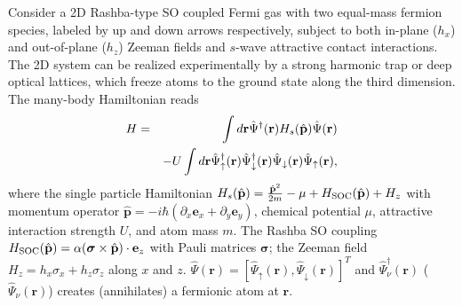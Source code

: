\documentclass[prl,aps,twocolumn,showpacs, floatfix]{revtex4}
\begin{document}
Consider a 2D Rashba-type SO coupled Fermi gas with two equal-mass fermion
species, labeled by up and down arrows respectively, subject to both
in-plane ($h_{x}$) and out-of-plane ($h_{z}$) Zeeman fields and $s$-wave
attractive contact interactions. The 2D system can be realized
experimentally by a strong harmonic trap or deep optical lattices, which
freeze atoms to the ground state along the third dimension. The many-body
Hamiltonian reads%
\begin{eqnarray}
H &=&\int d\mathbf{r}\hat{\Psi}^{\dagger }(\mathbf{r})H_{s}(\hat{\mathbf{p}})%
\hat{\Psi}(\mathbf{r}) \\
&&-U\int d\mathbf{r}\hat{\Psi}_{\uparrow }^{\dagger }(\mathbf{r})\hat{\Psi}%
_{\downarrow }^{\dagger }(\mathbf{r})\hat{\Psi}_{\downarrow }(\mathbf{r})%
\hat{\Psi}_{\uparrow }(\mathbf{r}),  \notag
\end{eqnarray}%
where the single particle Hamiltonian $H_{s}(\hat{\mathbf{p}})=\frac{\hat{%
\mathbf{p}}^{2}}{2m}-\mu +H_{\mathrm{SOC}}(\hat{\mathbf{p}})+H_{z}$ with
momentum operator $\hat{\mathbf{p}}=-i\hbar (\partial _{x}\mathbf{e}%
_{x}+\partial _{y}\mathbf{e}_{y})$, chemical potential $\mu $, attractive
interaction strength $U$, and atom mass $m$. The Rashba SO coupling $H_{%
\mathrm{SOC}}(\hat{\mathbf{p}})=\alpha ({\bm\sigma }\times \hat{\mathbf{p}}%
)\cdot {\mathbf{e}_{z}}$ with Pauli matrices $\mathbf{\sigma }$; the Zeeman
field $H_{z}=h_{x}\sigma _{x}+h_{z}\sigma _{z}$ along $x$ and $z$. $\hat{\Psi%
}(\mathbf{r})=[\hat{\Psi}_{\uparrow }(\mathbf{r}),\hat{\Psi}_{\downarrow }(%
\mathbf{r})]^{T}$ and $\hat{\Psi}_{\nu }^{\dagger }(\mathbf{r})$ ($\hat{\Psi}%
_{\nu }(\mathbf{r})$) creates (annihilates) a fermionic atom at $\mathbf{r}$.
\end{document}
